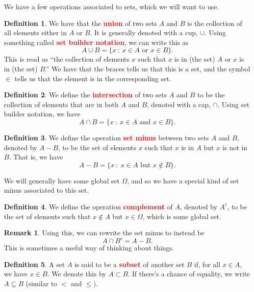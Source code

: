 \documentclass{book}
\theoremstyle{definition}
\numberwithin{problem}{chapter}
\numberwithin{solution}{chapter}
\numberwithin{theorem}{chapter}
\newtheorem{definition}{Definition}
\numberwithin{definition}{chapter}
\numberwithin{example}{chapter}
\newtheorem{remark}{Remark}
\numberwithin{remark}{chapter}
\numberwithin{claim}{chapter}
\numberwithin{fact}{chapter}
\numberwithin{preliminary}{chapter}
\numberwithin{corollary}{theorem}
\numberwithin{lemma}{chapter}
\numberwithin{proposition}{chapter}
\newcommand{\deff}[1]{\textbf{\textcolor{red}{#1}}}
\begin{document}
We have a few operations associated to sets, which we will want to use.

\begin{definition} 
We have that the \deff{union} of two sets $A$ and $B$ is the collection of all elements either in $A$ or $B$. It is generally denoted with a cup, $\cup$. Using something called \deff{set builder notation}, we can write this as 
\[ A \cup B = \{ x \ : \ x \in A \text{ or } x \in B \}. \]
This is read as ``the collection of elements $x$ such that $x$ is in (the set) $A$ or $x$ is in (the set) $B$.'' We have that the braces tells us that this is a set, and the symbol $\in$ tells us that the element is in the corresponding set. 
\end{definition}

\begin{definition} 
We define the \deff{intersection} of two sets $A$ and $B$ to be the collection of elements that are in both $A$ and $B$, denoted with a cap, $\cap$. Using set builder notation, we have 
\[ A \cap B = \{ x \ : \ x \in A \text{ and } x \in B \}.\]
\end{definition}

\begin{definition} 
We define the operation \deff{set minus} between two sets $A$ and $B$, denoted by $A - B$, to be the set of elements $x$ such that $x$ is in $A$ but $x$ is not in $B$. That is, we have 
\[A - B = \{ x \ : \ x \in A \text{ but } x \notin B\}. \]
\end{definition}

We will generally have some global set $\Omega$, and so we have a special kind of set minus associated to this set.

\begin{definition} 
We define the operation \deff{complement} of $A$, denoted by $A^c$, to be the set of elements such that $x \notin A$ but $x \in \Omega$, which is some global set.
\end{definition}

\begin{remark}
Using this, we can rewrite the set minus to instead be 
\[A \cap B^c = A - B. \]
This is sometimes a useful way of thinking about things.
\end{remark}

\begin{definition} 
A set $A$ is said to be a \deff{subset} of another set $B$ if, for all $x \in A$, we have $x \in B$. We denote this by $A \subset B$. If there's a chance of equality, we write $A \subseteq B$ (similar to $<$ and $\leq$).
\end{definition}
\end{document}
